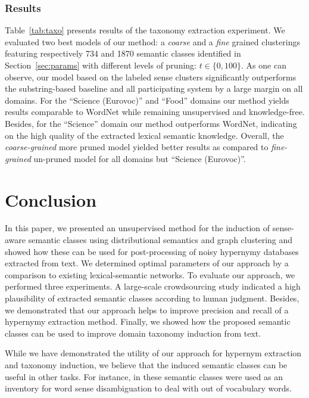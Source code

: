 \documentclass[10pt, a4paper]{article}
\begin{document}
\subsubsection{Results}

Table~\ref{tab:taxo} presents results of the taxonomy extraction experiment. We evaluated two best models of our method: a \textit{coarse} and a \textit{fine} grained clusterings featuring respectively 734 and 1870 semantic classes identified in Section~\ref{sec:params} with different levels of pruning: $t \in \{0, 100\}$. As one can observe, our model based on the labeled sense clusters  significantly outperforms the substring-based baseline and all participating system by a large margin on all domains. For the ``Science (Eurovoc)'' and ``Food'' domains our method yields results comparable to WordNet while remaining unsupervised and knowledge-free. Besides, for the ``Science'' domain our method outperforms WordNet, indicating on the high quality of the extracted lexical semantic knowledge. Overall, the \textit{coarse-grained} more pruned model yielded better results as compared to \textit{fine-grained} un-pruned model for all domains but ``Science (Eurovoc)''.


\section{Conclusion}

In this paper, we presented an unsupervised method for the induction of sense-aware semantic classes using distributional semantics and graph clustering and showed how these can be used for post-processing of noisy hypernymy databases extracted from text.
We determined optimal parameters of our approach by a comparison to existing lexical-semantic networks.
To evaluate our approach, we performed three experiments. A large-scale crowdsourcing study indicated a high plausibility of extracted semantic classes according to human judgment. Besides, we demonstrated that our approach helps to improve precision and recall of a hypernymy extraction method. Finally, we showed how the proposed semantic classes can be used to improve domain taxonomy induction from text. 

While we have demonstrated the utility of our approach for hypernym extraction and taxonomy induction, we believe that the induced semantic classes can be useful in other tasks. For instance, in \cite{panchenko-EtAl:2017:EMNLP2017Demos} these semantic classes were used as an inventory for word sense disambiguation to deal with out of vocabulary words.
\end{document}
